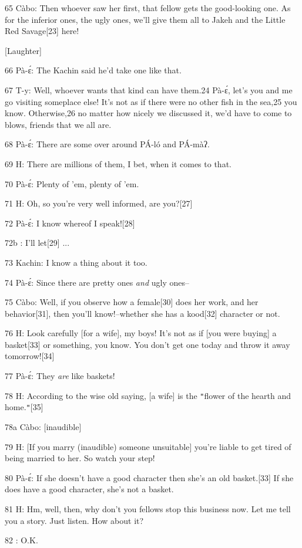 65 Càbo: Then whoever saw her first, that fellow gets the good-looking one. As
for the inferior ones, the ugly ones, we'll give them all to Jakeh and the Little
Red Savage[23] here!

\begin{center}
[Laughter]
\end{center}

\leftskip=0pt
66 Pà-ɛ́: The Kachin said he'd take one like that.

67 T-y: Well, whoever wants that kind can have them.{\small{}24} Pà-ɛ́, let's
you and me go visiting someplace else! It's not as if there were no other fish
in the sea,{\small{}25} you know. Otherwise,{\small{}26} no matter how nicely we
discussed it, we'd have to come to blows, friends that we all are.

68 Pà-ɛ́: There are some over around PÁ-ló and PÁ-màʔ.

69 H: There are millions of them, I bet, when it comes to that.

70 Pà-ɛ́: Plenty of 'em, plenty of 'em.

71 H: Oh, so you're very well informed, are you?[27]

72 Pà-ɛ́: I know whereof I speak![28]

72b       : I'll let[29] ...

73 Kachin: I know a thing about it too.

74 Pà-ɛ́: Since there are pretty ones \textit{and} ugly ones--

75 Càbo: Well, if you observe how a female[30] does her work, and her behavior[31],
then you'll know!--whether she has a kood[32] character or not.

76 H: Look carefully [for a wife], my boys! It's not as if [you were buying] a
basket[33] or something, you know. You don't get one today and throw it away tomorrow![34]

77 Pà-ɛ́: They \textit{are} like baskets!

78 H: According to the wise old saying, [a wife] is the \texttt{"}flower of the
hearth and home.\texttt{"}[35]

78a Càbo: [inaudible]

79 H: [If you marry (inaudible) someone unsuitable] you're liable to get tired
of being married to her. So watch your step!

80 Pà-ɛ́: If she doesn't have a good character then she's an old basket.[33]
If she does have a good character, she's not a basket.

81 H: Hm, well, then, why don't you fellows stop this business now. Let me tell
you a story. Just listen. How about it?

82    : O.K.

